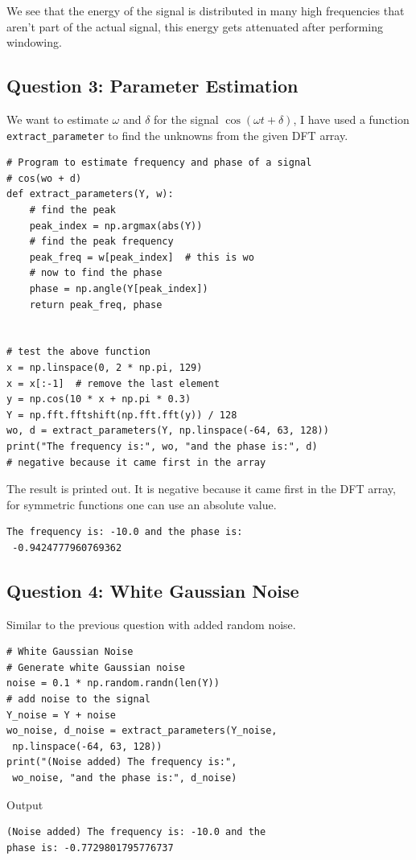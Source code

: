 \documentclass[11pt, a4paper]{article}
\begin{document}
We see that the energy of the signal is distributed in many high frequencies that aren’t part of the actual signal, this energy gets attenuated after
performing windowing. 

\subsection{Question 3: Parameter Estimation}
We want to estimate $\omega$ and $\delta$ for the signal $\cos(\omega t+\delta)$, I have used a function \texttt{extract\_parameter} to find the unknowns from the given DFT array.

\begin{verbatim}
# Program to estimate frequency and phase of a signal
# cos(wo + d)
def extract_parameters(Y, w):
    # find the peak
    peak_index = np.argmax(abs(Y))
    # find the peak frequency
    peak_freq = w[peak_index]  # this is wo
    # now to find the phase
    phase = np.angle(Y[peak_index])
    return peak_freq, phase


# test the above function
x = np.linspace(0, 2 * np.pi, 129)
x = x[:-1]  # remove the last element
y = np.cos(10 * x + np.pi * 0.3)
Y = np.fft.fftshift(np.fft.fft(y)) / 128
wo, d = extract_parameters(Y, np.linspace(-64, 63, 128))
print("The frequency is:", wo, "and the phase is:", d)
# negative because it came first in the array
\end{verbatim}  

The result is printed out. It is negative because it came first in the DFT array, for symmetric functions one can use an absolute value. 
\begin{verbatim}
The frequency is: -10.0 and the phase is:
 -0.9424777960769362
\end{verbatim}

\subsection{Question 4: White Gaussian Noise}
Similar to the previous question with added random noise. 
\begin{verbatim}
# White Gaussian Noise
# Generate white Gaussian noise
noise = 0.1 * np.random.randn(len(Y))
# add noise to the signal
Y_noise = Y + noise
wo_noise, d_noise = extract_parameters(Y_noise,
 np.linspace(-64, 63, 128))
print("(Noise added) The frequency is:",
 wo_noise, "and the phase is:", d_noise)

\end{verbatim}
 
 Output
\begin{verbatim}
(Noise added) The frequency is: -10.0 and the 
phase is: -0.7729801795776737
\end{verbatim}   
\end{document}

